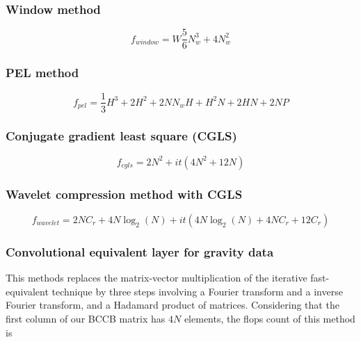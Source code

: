 \subsubsection{Window method \citep{leao-silva1989}}

\begin{equation}
	f_{window} = W\dfrac{5}{6} N_w^3 + 4N_w^2
\label{flops_leao-silva}
\end{equation}

\subsubsection{PEL method \citep{oliveirajr-etal2013}}

\begin{equation}
	f_{pel} = \dfrac{1}{3} H^3 + 2H^2 + 2NN_wH + H^2N + 2HN + 2NP
\label{flops_pel}
\end{equation}

\subsubsection{Conjugate gradient least square (CGLS)}

\begin{equation}
	f_{cgls} = 2N^2 + it(4N^2 + 12N)
\label{cgls}
\end{equation}

\subsubsection{Wavelet compression method with CGLS \citep{li-oldenburg2010}}

\begin{equation}
	f_{wavelet} = 2NC_r + 4N\log_2(N) + it(4N\log_2(N) + 4NC_r + 12C_r)
\label{wavelet}
\end{equation}

\subsubsection{Convolutional equivalent layer for gravity data \citep{takahashi2020}}

This methods replaces the matrix-vector multiplication of the iterative fast-equivalent technique \citep{siqueira-etal2017} by three steps involving a Fourier transform and a inverse Fourier transform, 
and a Hadamard product of matrices. Considering that the first column of our BCCB matrix has $4N$ elements, the flops count of this method is

